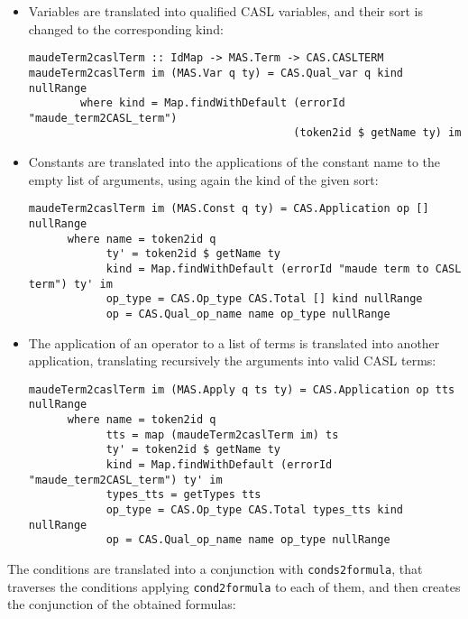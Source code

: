 \begin{itemize}

\item Variables are translated into qualified CASL variables, and their
sort is changed to the corresponding kind:

{\codesize
\begin{verbatim}
maudeTerm2caslTerm :: IdMap -> MAS.Term -> CAS.CASLTERM
maudeTerm2caslTerm im (MAS.Var q ty) = CAS.Qual_var q kind nullRange
        where kind = Map.findWithDefault (errorId "maude_term2CASL_term")
                                         (token2id $ getName ty) im
\end{verbatim}
}

\item Constants are translated into the applications of the constant
name to the empty list of arguments, using again the kind of the
given sort:

{\codesize
\begin{verbatim}
maudeTerm2caslTerm im (MAS.Const q ty) = CAS.Application op [] nullRange
      where name = token2id q
            ty' = token2id $ getName ty
            kind = Map.findWithDefault (errorId "maude term to CASL term") ty' im
            op_type = CAS.Op_type CAS.Total [] kind nullRange
            op = CAS.Qual_op_name name op_type nullRange
\end{verbatim}
}

\item The application of an operator to a list of terms is translated
into another application, translating recursively the arguments into
valid CASL terms:

{\codesize
\begin{verbatim}
maudeTerm2caslTerm im (MAS.Apply q ts ty) = CAS.Application op tts nullRange
      where name = token2id q
            tts = map (maudeTerm2caslTerm im) ts
            ty' = token2id $ getName ty
            kind = Map.findWithDefault (errorId "maude_term2CASL_term") ty' im
            types_tts = getTypes tts
            op_type = CAS.Op_type CAS.Total types_tts kind nullRange
            op = CAS.Qual_op_name name op_type nullRange
\end{verbatim}
}

\end{itemize}

The conditions are translated into a conjunction with \verb"conds2formula",
that traverses the conditions applying \verb"cond2formula" to each of them,
and then creates the conjunction of the obtained formulas:

